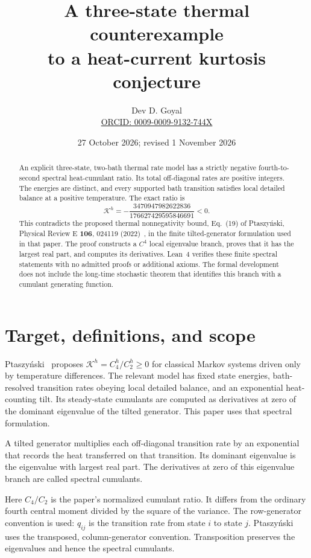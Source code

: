 \documentclass[11pt,a4paper]{article}
\title{\color{navy}A three-state thermal counterexample\protect\\to a heat-current kurtosis conjecture}
\author{Dev D. Goyal\\[3pt]\small\href{https://orcid.org/0009-0009-9132-744X}{ORCID: 0009-0009-9132-744X}}
\date{27 October 2026; revised 1 November 2026}
\newcommand{\K}{\mathcal K}
\begin{document}
\maketitle
\begin{abstract}
An explicit three-state, two-bath thermal rate model has a strictly negative fourth-to-second spectral heat-cumulant ratio. Its total off-diagonal rates are positive integers. The energies are distinct, and every supported bath transition satisfies local detailed balance at a positive temperature. The exact ratio is
\[
\K^h=-\frac{3470947982622836}{176627429595846691}<0.
\]
This contradicts the proposed thermal nonnegativity bound, Eq.~(19) of Ptaszy\'nski, Physical Review E \textbf{106}, 024119 (2022)~\cite{ptaszynski2022}, in the finite tilted-generator formulation used in that paper. The proof constructs a $C^4$ local eigenvalue branch, proves that it has the largest real part, and computes its derivatives. Lean~4 verifies these finite spectral statements with no admitted proofs or additional axioms. The formal development does not include the long-time stochastic theorem that identifies this branch with a cumulant generating function.
\end{abstract}

\section{Target, definitions, and scope}\label{sec:scope}
Ptaszy\'nski~\cite{ptaszynski2022} proposes $\K^h=C_4^h/C_2^h\geq0$ for classical Markov systems driven only by temperature differences. The relevant model has fixed state energies, bath-resolved transition rates obeying local detailed balance, and an exponential heat-counting tilt. Its steady-state cumulants are computed as derivatives at zero of the dominant eigenvalue of the tilted generator. This paper uses that spectral formulation.

A tilted generator multiplies each off-diagonal transition rate by an exponential that records the heat transferred on that transition. Its dominant eigenvalue is the eigenvalue with largest real part. The derivatives at zero of this eigenvalue branch are called spectral cumulants.

Here $C_4/C_2$ is the paper's normalized cumulant ratio. It differs from the ordinary fourth central moment divided by the square of the variance. The row-generator convention is used: $q_{ij}$ is the transition rate from state $i$ to state $j$. Ptaszy\'nski uses the transposed, column-generator convention. Transposition preserves the eigenvalues and hence the spectral cumulants.
\end{document}
